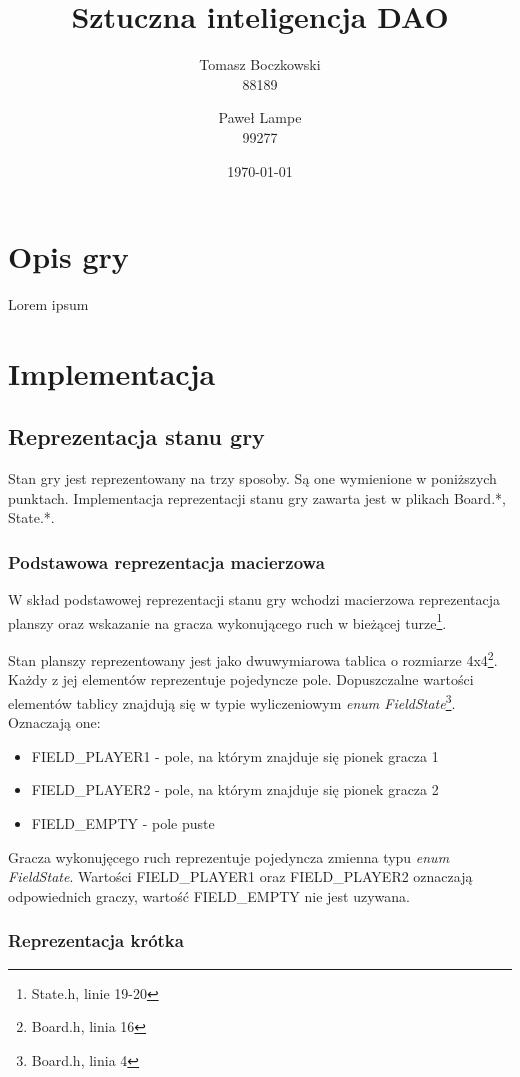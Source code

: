 \documentclass{scrartcl}
\title{Sztuczna inteligencja DAO}
\date{\today}
\author{Tomasz Boczkowski\\ 88189 \and Paweł Lampe\\ 99277}
\begin{document}


\section{Opis gry}

Lorem ipsum

\section{Implementacja}

\subsection{Reprezentacja stanu gry}

Stan gry jest reprezentowany na trzy sposoby. Są one wymienione w
poniższych punktach. Implementacja reprezentacji stanu gry zawarta 
jest w plikach Board.*, State.*.

\subsubsection{Podstawowa reprezentacja macierzowa}

W skład podstawowej reprezentacji stanu gry wchodzi 
macierzowa reprezentacja planszy oraz
wskazanie na gracza wykonującego ruch w bieżącej turze\footnote{
State.h, linie 19-20}. 

Stan planszy reprezentowany jest jako dwuwymiarowa tablica o rozmiarze
4x4\footnote{Board.h, linia 16}. Każdy z jej elementów reprezentuje
pojedyncze pole. Dopuszczalne
wartości elementów tablicy znajdują się w typie wyliczeniowym
\emph{enum FieldState}\footnote{Board.h, linia 4}. Oznaczają one:
\begin{itemize}
\item FIELD\_PLAYER1 - pole, na którym znajduje się pionek gracza 1
\item FIELD\_PLAYER2 - pole, na którym znajduje się pionek gracza 2
\item FIELD\_EMPTY - pole puste
\end{itemize}

Gracza wykonujęcego ruch reprezentuje pojedyncza zmienna typu
\emph{enum FieldState}. Wartości FIELD\_PLAYER1 oraz FIELD\_PLAYER2 
oznaczają odpowiednich graczy, wartość FIELD\_EMPTY nie jest
uzywana.

\subsubsection{Reprezentacja krótka}
\end{document}
